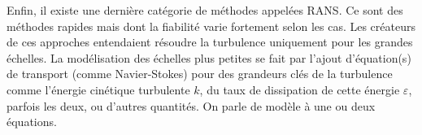 \documentclass[a4paper,12pt]{article}
\newcommand{\keps}{$k-\varepsilon$}
\numberwithin{equation}{section} %
\begin{document}
\noindent Enfin, il existe une dernière catégorie de méthodes appelées RANS. Ce sont des méthodes rapides mais dont la fiabilité varie fortement selon les cas. Les créateurs de ces approches entendaient résoudre la turbulence uniquement pour les grandes échelles. La modélisation des échelles plus petites se fait par l'ajout d'équation(s) de transport (comme Navier-Stokes) pour des grandeurs clés de la turbulence comme l'énergie cinétique turbulente $k$, du taux de dissipation de cette énergie $\varepsilon$, parfois les deux, ou d'autres quantités. On parle de modèle à une ou deux équations. \\%
\end{document}

